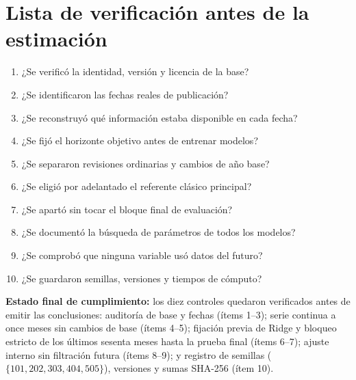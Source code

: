 \section{Lista de verificación antes de la estimación}
\label{app:checklist}

\begin{enumerate}
	\item ¿Se verificó la identidad, versión y licencia de la base?
	\item ¿Se identificaron las fechas reales de publicación?
	\item ¿Se reconstruyó qué información estaba disponible en cada fecha?
	\item ¿Se fijó el horizonte objetivo antes de entrenar modelos?
	\item ¿Se separaron revisiones ordinarias y cambios de año base?
	\item ¿Se eligió por adelantado el referente clásico principal?
	\item ¿Se apartó sin tocar el bloque final de evaluación?
	\item ¿Se documentó la búsqueda de parámetros de todos los modelos?
	\item ¿Se comprobó que ninguna variable usó datos del futuro?
	\item ¿Se guardaron semillas, versiones y tiempos de cómputo?
\end{enumerate}

\medskip\noindent\textbf{Estado final de cumplimiento:} los diez controles quedaron verificados antes de emitir las conclusiones: auditoría de base y fechas (ítems 1--3); serie continua a once meses sin cambios de base (ítems 4--5); fijación previa de Ridge y bloqueo estricto de los últimos sesenta meses hasta la prueba final (ítems 6--7); ajuste interno sin filtración futura (ítems 8--9); y registro de semillas (\(\{101,202,303,404,505\}\)), versiones y sumas SHA-256 (ítem 10).
